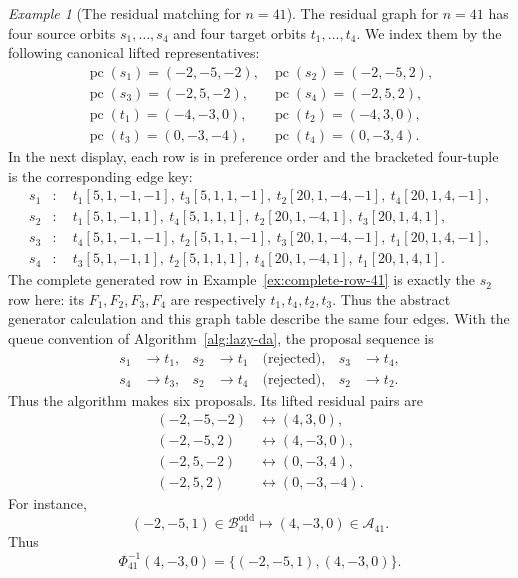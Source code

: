 \documentclass[11pt]{amsart}
\theoremstyle{definition}
\theoremstyle{remark}
\newtheorem{example}[theorem]{Example}
\newcommand{\pc}{\operatorname{pc}}
\begin{document}
\begin{example}[The residual matching for $n=41$]
\label{ex:41-residual}
The residual graph for $n=41$ has four source orbits $s_1,\ldots,s_4$ and
four target orbits $t_1,\ldots,t_4$.  We index them by the following
canonical lifted representatives:
\[
\begin{array}{ll}
 \pc(s_1)=(-2,-5,-2),&\pc(s_2)=(-2,-5,2),\\
 \pc(s_3)=(-2,5,-2), &\pc(s_4)=(-2,5,2),\\[2pt]
 \pc(t_1)=(-4,-3,0), &\pc(t_2)=(-4,3,0),\\
 \pc(t_3)=(0,-3,-4), &\pc(t_4)=(0,-3,4).
\end{array}
\]
In the next display, each row is in preference order and the bracketed
four-tuple is the corresponding edge key:
\[
\begin{aligned}
s_1&:\quad t_1[5,1,-1,-1],\ t_3[5,1,1,-1],
       \ t_2[20,1,-4,-1],\ t_4[20,1,4,-1],\\
s_2&:\quad t_1[5,1,-1,1],\ t_4[5,1,1,1],
       \ t_2[20,1,-4,1],\ t_3[20,1,4,1],\\
s_3&:\quad t_4[5,1,-1,-1],\ t_2[5,1,1,-1],
       \ t_3[20,1,-4,-1],\ t_1[20,1,4,-1],\\
s_4&:\quad t_3[5,1,-1,1],\ t_2[5,1,1,1],
       \ t_4[20,1,-4,1],\ t_1[20,1,4,1].
\end{aligned}
\]
The complete generated row in Example~\ref{ex:complete-row-41} is exactly the
$s_2$ row here: its $F_1,F_2,F_3,F_4$ are respectively
$t_1,t_4,t_2,t_3$.  Thus the abstract generator calculation and this graph
table describe the same four edges.
With the queue convention of Algorithm~\ref{alg:lazy-da}, the proposal
sequence is
\[
\begin{aligned}
s_1&\longrightarrow t_1,&
s_2&\longrightarrow t_1\quad\text{(rejected)},&
s_3&\longrightarrow t_4,\\
s_4&\longrightarrow t_3,&
s_2&\longrightarrow t_4\quad\text{(rejected)},&
s_2&\longrightarrow t_2.
\end{aligned}
\]
Thus the algorithm makes six proposals.  Its lifted residual pairs are
\[
\begin{aligned}
 (-2,-5,-2)&\longleftrightarrow(4,3,0),\\
 (-2,-5,2)&\longleftrightarrow(4,-3,0),\\
 (-2,5,-2)&\longleftrightarrow(0,-3,4),\\
 (-2,5,2)&\longleftrightarrow(0,-3,-4).
\end{aligned}
\]
For instance,
\[
 (-2,-5,1)\in\mathcal B_{41}^{\mathrm{odd}}
 \longmapsto
 (4,-3,0)\in\mathcal A_{41}.
\]
Thus
\[
\Phi_{41}^{-1}(4,-3,0)
 =\{(-2,-5,1),(4,-3,0)\}.
\]
\end{example}
\end{document}
